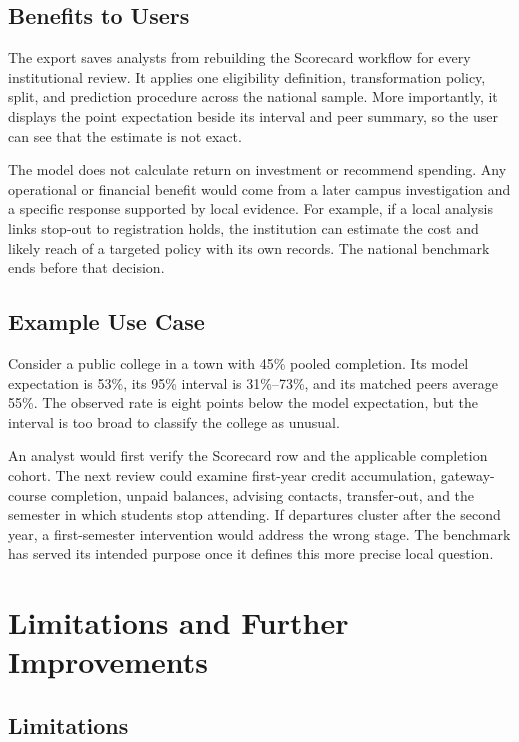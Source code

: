 \documentclass[12pt,a4paper]{article}
\begin{document}
\subsection{Benefits to Users}

The export saves analysts from rebuilding the Scorecard workflow for every institutional review. It applies one eligibility definition, transformation policy, split, and prediction procedure across the national sample. More importantly, it displays the point expectation beside its interval and peer summary, so the user can see that the estimate is not exact.

The model does not calculate return on investment or recommend spending. Any operational or financial benefit would come from a later campus investigation and a specific response supported by local evidence. For example, if a local analysis links stop-out to registration holds, the institution can estimate the cost and likely reach of a targeted policy with its own records. The national benchmark ends before that decision.

\subsection{Example Use Case}

Consider a public college in a town with 45\% pooled completion. Its model expectation is 53\%, its 95\% interval is 31\%--73\%, and its matched peers average 55\%. The observed rate is eight points below the model expectation, but the interval is too broad to classify the college as unusual.

An analyst would first verify the Scorecard row and the applicable completion cohort. The next review could examine first-year credit accumulation, gateway-course completion, unpaid balances, advising contacts, transfer-out, and the semester in which students stop attending. If departures cluster after the second year, a first-semester intervention would address the wrong stage. The benchmark has served its intended purpose once it defines this more precise local question.

\section{Limitations and Further Improvements}

\subsection{Limitations}
\end{document}
